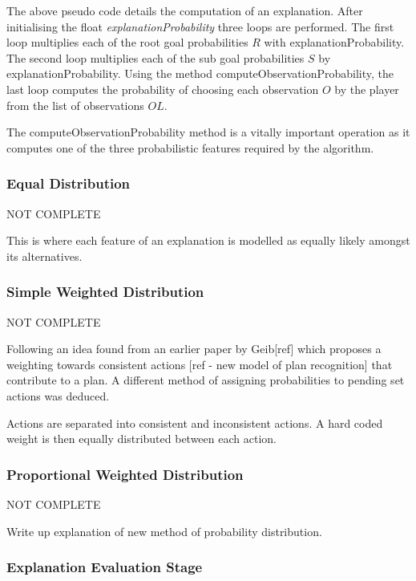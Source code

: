\documentclass[parskip]{cs4rep}
\begin{document}
The above pseudo code details the computation of an explanation. After initialising the float \textit{explanationProbability} three loops are performed. The first loop multiplies each of the root goal probabilities $R$ with explanationProbability. The second loop multiplies each of the sub goal probabilities $S$ by explanationProbability. Using the method computeObservationProbability, the last loop computes the probability of choosing each observation $O$ by the player from the list of observations $OL$.

The computeObservationProbability method is a vitally important operation as it computes one of the three probabilistic features required by the algorithm.

\subsubsection{Equal Distribution}

NOT COMPLETE

This is where each feature of an explanation is modelled as equally likely amongst its alternatives. 

\subsubsection{Simple Weighted Distribution}

NOT COMPLETE

Following an idea found from an earlier paper by Geib[ref] which proposes a weighting towards consistent actions [ref - new model of plan recognition] that contribute to a plan. A different method of assigning probabilities to pending set actions was deduced.

Actions are separated into consistent and inconsistent actions. A hard coded weight is then equally distributed between each action.

\subsubsection{Proportional Weighted Distribution}

NOT COMPLETE

Write up explanation of new method of probability distribution.

\subsubsection{Explanation Evaluation Stage}
\end{document}
